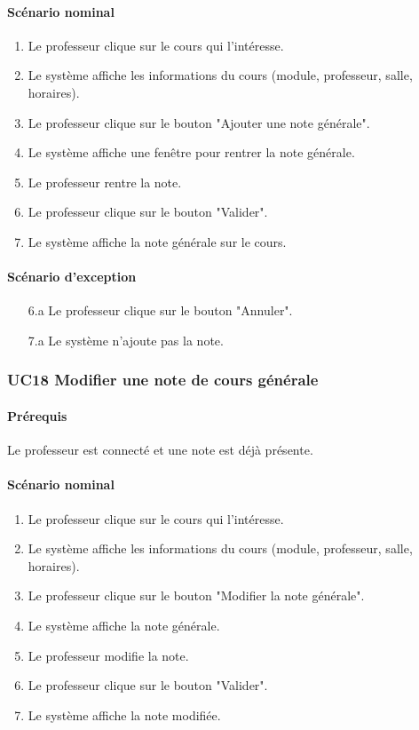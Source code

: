 \documentclass[a4paper,12pt]{article}
\begin{document}
\paragraph{Scénario nominal}
\begin{enumerate}
    \item Le professeur clique sur le cours qui l'intéresse.
    \item Le système affiche les informations du cours (module, professeur, salle, horaires).
    \item Le professeur clique sur le bouton "Ajouter une note générale".
    \item Le système affiche une fenêtre pour rentrer la note générale.
    \item Le professeur rentre la note.
    \item Le professeur clique sur le bouton "Valider".
    \item Le système affiche la note générale sur le cours.
\end{enumerate}

\paragraph{Scénario d'exception}
\begin{enumerate}
    \item[6.a] Le professeur clique sur le bouton "Annuler".
    \item[7.a] Le système n'ajoute pas la note.
\end{enumerate}

\subsubsection{UC18 Modifier une note de cours générale}
\paragraph{Prérequis} Le professeur est connecté et une note est déjà présente.

\paragraph{Scénario nominal}
\begin{enumerate}
    \item Le professeur clique sur le cours qui l'intéresse.
    \item Le système affiche les informations du cours (module, professeur, salle, horaires).
    \item Le professeur clique sur le bouton "Modifier la note générale".
    \item Le système affiche la note générale.
    \item Le professeur modifie la note.
    \item Le professeur clique sur le bouton "Valider".
    \item Le système affiche la note modifiée.
\end{enumerate}
\end{document}
